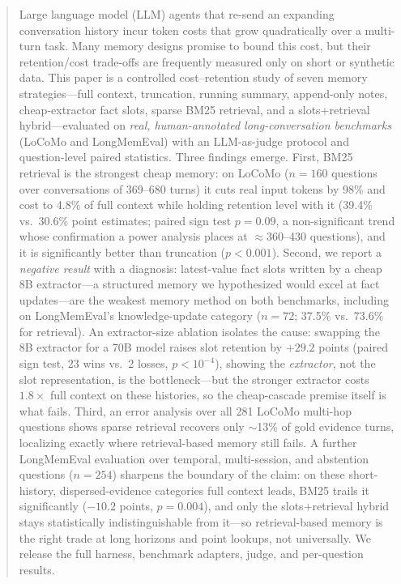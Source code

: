 \documentclass[conference]{IEEEtran}
\begin{document}
\begin{abstract}
Large language model (LLM) agents that re-send an expanding conversation history incur token costs that grow quadratically over a multi-turn task. Many memory designs promise to bound this cost, but their retention/cost trade-offs are frequently measured only on short or synthetic data. This paper is a controlled cost--retention study of seven memory strategies---full context, truncation, running summary, append-only notes, cheap-extractor fact slots, sparse BM25 retrieval, and a slots+retrieval hybrid---evaluated on \emph{real, human-annotated long-conversation benchmarks} (LoCoMo and LongMemEval) with an LLM-as-judge protocol and question-level paired statistics. Three findings emerge. First, BM25 retrieval is the strongest cheap memory: on LoCoMo ($n{=}160$ questions over conversations of 369--680 turns) it cuts real input tokens by 98\% and cost to 4.8\% of full context while holding retention level with it (39.4\% vs.\ 30.6\% point estimates; paired sign test $p{=}0.09$, a non-significant trend whose confirmation a power analysis places at $\approx$360--430 questions), and it is significantly better than truncation ($p{<}0.001$). Second, we report a \emph{negative result} with a diagnosis: latest-value fact slots written by a cheap 8B extractor---a structured memory we hypothesized would excel at fact updates---are the weakest memory method on both benchmarks, including on LongMemEval's knowledge-update category ($n{=}72$; 37.5\% vs.\ 73.6\% for retrieval). An extractor-size ablation isolates the cause: swapping the 8B extractor for a 70B model raises slot retention by $+29.2$ points (paired sign test, 23 wins vs.\ 2 losses, $p{<}10^{-4}$), showing the \emph{extractor}, not the slot representation, is the bottleneck---but the stronger extractor costs $1.8\times$ full context on these histories, so the cheap-cascade premise itself is what fails. Third, an error analysis over all 281 LoCoMo multi-hop questions shows sparse retrieval recovers only $\sim$13\% of gold evidence turns, localizing exactly where retrieval-based memory still fails. A further LongMemEval evaluation over temporal, multi-session, and abstention questions ($n{=}254$) sharpens the boundary of the claim: on these short-history, dispersed-evidence categories full context leads, BM25 trails it significantly ($-10.2$ points, $p{=}0.004$), and only the slots+retrieval hybrid stays statistically indistinguishable from it---so retrieval-based memory is the right trade at long horizons and point lookups, not universally. We release the full harness, benchmark adapters, judge, and per-question results.
\end{abstract}
\end{document}
